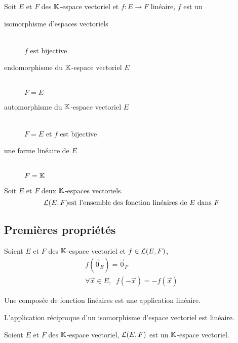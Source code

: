\begin{dfn}
Soit $E$ et $F$ des $\mathbb{K}$-espace vectoriel et $f : E \to F$ linéaire,
$f$ est un
\begin{description}
    \item[isomorphisme d'espaces vectoriels] \quad \\
    \ssi $f$ est bijective
    \item[endomorphisme du $\mathbb{K}$-espace vectoriel $E$] \quad \\
    \ssi $F = E$
    \item[automorphisme du $\mathbb{K}$-espace vectoriel $E$] \quad \\
    \ssi $F = E$ et $f$ est bijective
    \item[une forme linéaire de $E$] \quad \\
    \ssi $F = \mathbb{K}$
\end{description}
\end{dfn}

\begin{dfn}
Soit $E$ et $F$ deux $\mathbb{K}$-espaces vectoriels.
\[
    \operatorname{\mathcal{L}}(E, F) \text{est l'ensemble des fonction linéaires de } E
    \text{ dans } F
\]
\end{dfn}


\subsection{Premières propriétés}

\begin{prp}
Soient $E$ et $F$ des $\mathbb{K}$-espace vectoriel et $f \in \operatorname{\mathcal{L}}(E, F)$,
\begin{gather*}
    f(\vec{0}_E) = \vec{0}_F \\
    \forall \vec{x} \in E, \;\; f(-\vec{x}) = -f(\vec{x})
\end{gather*}
\end{prp}

\begin{prp}
Une composée de fonction linéaires est une application linéaire.
\end{prp}

\begin{prp}
L'application réciproque d'un isomorphisme d'espace vectoriel est linéaire.
\end{prp}

\begin{prp}
Soient $E$ et $F$ des $\mathbb{K}$-espace vectoriel, $\operatorname{\mathcal{L}}(E, F)$ est un
$\mathbb{K}$-espace vectoriel.
\end{prp}

